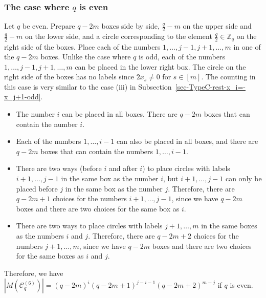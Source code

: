 \documentclass{article}
\theoremstyle{plain}
\theoremstyle{definition}
\theoremstyle{remark}
\numberwithin{equation}{section}
\newcommand{\Cc}{\mathcal{C}}
\begin{document}
\subsubsection{The case where $q$ is even}\label{sec-TypeC-rest-x_i=-x_j+1-even}
Let $q$ be even.
Prepare $q-2m$ boxes side by side, $\displaystyle \frac{q}{2}-m$ on the upper side and $\displaystyle \frac{q}{2}-m$ on the lower side, and a circle corresponding to the element $\displaystyle \frac{q}{2}\in\mathbb{Z}_q$ on the right side of the boxes.
Place each of the numbers $1,\dots,j-1,j+1,\dots,m$ in one of the $q-2m$ boxes.
Unlike the case where $q$ is odd, each of the numbers $1,\dots,j-1,j+1,\dots,m$ can be placed in the lower right box.
The circle on the right side of the boxes has no labels since $2x_s\neq 0$ for $s\in [m]$.
The counting in this case is very similar to the case (i\hspace{-0.5mm}i\hspace{-0.5mm}i) in Subsection~\ref{sec-TypeC-rest-x_i=-x_j+1-odd}.

\begin{itemize}
\item The number $i$ can be placed in all boxes.
There are $q-2m$ boxes that can contain the number $i$.

\item Each of the numbers $1,\dots,i-1$ can also be placed in all boxes, and there are $q-2m$ boxes that can contain the numbers $1,\dots,i-1$.

\item There are two ways (before $i$ and after $i$) to place circles with labels $i+1,\dots,j-1$ in the same box as the number $i$, but $i+1,\dots,j-1$ can only be placed before $j$ in the same box as the number $j$.
Therefore, there are $q-2m+1$ choices for the numbers $i+1,\dots,j-1$, since we have $q-2m$ boxes and there are two choices for the same box as $i$.

\item There are two ways to place circles with labels $j+1,\dots,m$ in the same boxes as the numbers $i$ and $j$.
Therefore, there are $q-2m+2$ choices for the numbers $j+1,\dots,m$, since we have $q-2m$ boxes and there are two choices for the same boxes as $i$ and $j$.
\end{itemize}
Therefore, we have $|M(\Cc^{(6)}_q)|=(q-2m)^{i}(q-2m+1)^{j-i-1}(q-2m+2)^{m-j}$ if $q$ is even.
\end{document}
